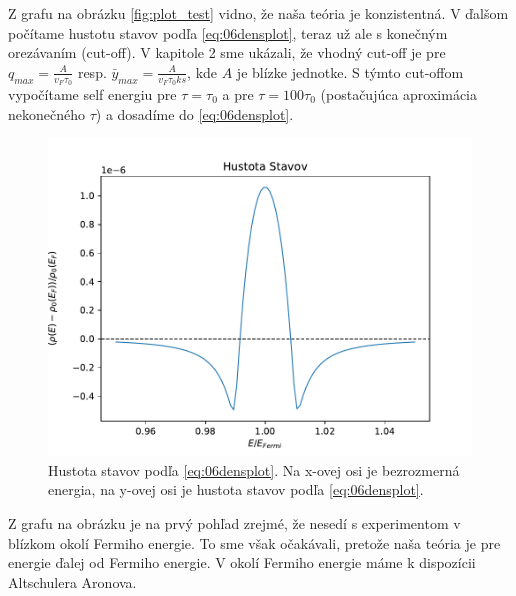 Z grafu na obrázku \ref{fig:plot_test} vidno, že naša teória je konzistentná. V ďalšom počítame hustotu stavov podľa \eqref{eq:06densplot}, teraz už ale s konečným orezávaním (cut-off). V kapitole 2 sme ukázali, že vhodný cut-off je
pre $q_{max}=\frac{A}{v_F \tau_0}$ resp. $\bar{y}_{max}=\frac{A}{v_F \tau_0 ks}$, kde $A$ je blízke jednotke. S týmto cut-offom vypočítame self energiu pre $\tau=\tau_0$ a pre $\tau=100\tau_0$ (postačujúca aproximácia nekonečného $\tau$) a dosadíme do \eqref{eq:06densplot}. 

\begin{figure}[H]
\centering
\includegraphics[scale=1]{grafy/plot_dos}
\caption{Hustota stavov podľa \eqref{eq:06densplot}. Na x-ovej osi je bezrozmerná energia, na y-ovej osi je hustota stavov podľa \eqref{eq:06densplot}.}
\end{figure}
Z grafu na obrázku je na prvý pohľad zrejmé, že nesedí s experimentom v blízkom okolí Fermiho energie. To sme však očakávali, pretože naša teória je pre energie ďalej od Fermiho energie. V okolí Fermiho energie máme k dispozícii Altschulera Aronova. 

